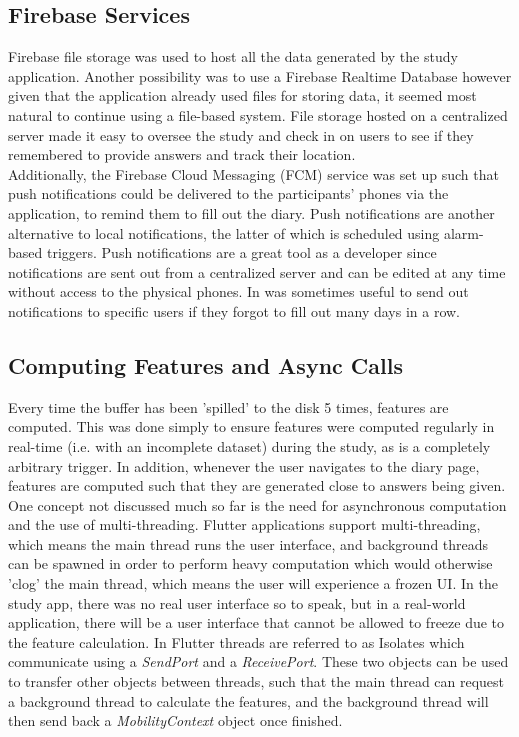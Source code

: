 \subsection{Firebase Services}
Firebase file storage was used to host all the data generated by the study application. Another possibility was to use a Firebase Realtime Database however given that the application already used files for storing data, it seemed most natural to continue using a file-based system. File storage hosted on a centralized server made it easy to oversee the study and check in on users to see if they remembered to provide answers and track their location. \\

Additionally, the Firebase Cloud Messaging (FCM) service was set up such that push notifications could be delivered to the participants' phones via the application, to remind them to fill out the diary. Push notifications are another alternative to local notifications, the latter of which is scheduled using alarm-based triggers. Push notifications are a great tool as a developer since notifications are sent out from a centralized server and can be edited at any time without access to the physical phones. In was sometimes useful to send out notifications to specific users if they forgot to fill out many days in a row.

\subsection{Computing Features and Async Calls }
Every time the buffer has been 'spilled' to the disk 5 times, features are computed. This was done simply to ensure features were computed regularly in real-time (i.e. with an incomplete dataset) during the study, as is a completely arbitrary trigger. In addition, whenever the user navigates to the diary page, features are computed such that they are generated close to answers being given. One concept not discussed much so far is the need for asynchronous computation and the use of multi-threading. Flutter applications support multi-threading, which means the main thread runs the user interface, and background threads can be spawned in order to perform heavy computation which would otherwise 'clog' the main thread, which means the user will experience a frozen UI. In the study app, there was no real user interface so to speak, but in a real-world application, there will be a user interface that cannot be allowed to freeze due to the feature calculation. In Flutter threads are referred to as Isolates which communicate using a \textit{SendPort} and a \textit{ReceivePort}. These two objects can be used to transfer other objects between threads, such that the main thread can request a background thread to calculate the features, and the background thread will then send back a \textit{MobilityContext} object once finished. 

